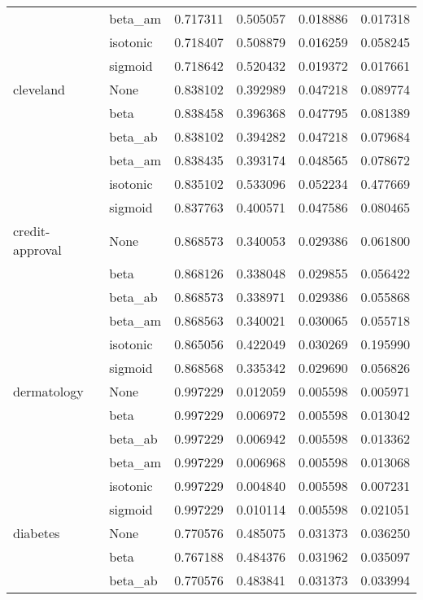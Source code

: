 \begin{tabular}{llrrrr}
        & beta\_am &  0.717311 &  0.505057 &  0.018886 &  0.017318 \\
        & isotonic &  0.718407 &  0.508879 &  0.016259 &  0.058245 \\
        & sigmoid &  0.718642 &  0.520432 &  0.019372 &  0.017661 \\
cleveland & None &  0.838102 &  0.392989 &  0.047218 &  0.089774 \\
        & beta &  0.838458 &  0.396368 &  0.047795 &  0.081389 \\
        & beta\_ab &  0.838102 &  0.394282 &  0.047218 &  0.079684 \\
        & beta\_am &  0.838435 &  0.393174 &  0.048565 &  0.078672 \\
        & isotonic &  0.835102 &  0.533096 &  0.052234 &  0.477669 \\
        & sigmoid &  0.837763 &  0.400571 &  0.047586 &  0.080465 \\
credit-approval & None &  0.868573 &  0.340053 &  0.029386 &  0.061800 \\
        & beta &  0.868126 &  0.338048 &  0.029855 &  0.056422 \\
        & beta\_ab &  0.868573 &  0.338971 &  0.029386 &  0.055868 \\
        & beta\_am &  0.868563 &  0.340021 &  0.030065 &  0.055718 \\
        & isotonic &  0.865056 &  0.422049 &  0.030269 &  0.195990 \\
        & sigmoid &  0.868568 &  0.335342 &  0.029690 &  0.056826 \\
dermatology & None &  0.997229 &  0.012059 &  0.005598 &  0.005971 \\
        & beta &  0.997229 &  0.006972 &  0.005598 &  0.013042 \\
        & beta\_ab &  0.997229 &  0.006942 &  0.005598 &  0.013362 \\
        & beta\_am &  0.997229 &  0.006968 &  0.005598 &  0.013068 \\
        & isotonic &  0.997229 &  0.004840 &  0.005598 &  0.007231 \\
        & sigmoid &  0.997229 &  0.010114 &  0.005598 &  0.021051 \\
diabetes & None &  0.770576 &  0.485075 &  0.031373 &  0.036250 \\
        & beta &  0.767188 &  0.484376 &  0.031962 &  0.035097 \\
        & beta\_ab &  0.770576 &  0.483841 &  0.031373 &  0.033994 \\

\end{tabular}
